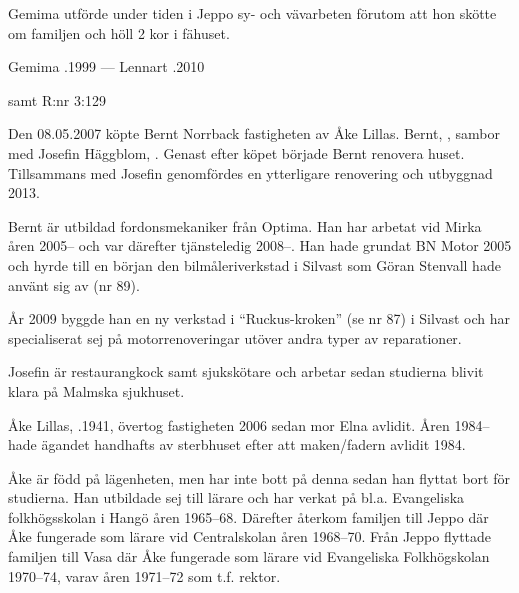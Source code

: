 Gemima utförde under tiden i Jeppo sy- och vävarbeten förutom att hon skötte om familjen och höll 2 kor i fähuset.

Gemima .1999  ---  Lennart .2010



%
 samt  R:nr 3:129



%

Den 08.05.2007 köpte Bernt Norrback fastigheten av Åke Lillas. Bernt, ,  sambor med Josefin Häggblom, . Genast efter köpet började Bernt renovera huset. Tillsammans med Josefin genomfördes en ytterligare renovering och utbyggnad 2013.

Bernt är utbildad fordonsmekaniker från Optima. Han har arbetat vid Mirka åren 2005-- och var därefter tjänsteledig 2008--. Han hade grundat BN Motor 2005 och hyrde till en början den bilmåleriverkstad i Silvast som Göran Stenvall hade använt sig av (nr 89).

År 2009 byggde han en ny verkstad i ``Ruckus-kroken'' (se nr 87) i Silvast och har specialiserat sej på motorrenoveringar utöver andra typer av reparationer.

Josefin är restaurangkock samt sjukskötare och arbetar sedan studierna blivit klara på Malmska sjukhuset.
\begin{jhchildren}
  \item {}
  \item {}
\end{jhchildren}


%
Åke Lillas, .1941, övertog fastigheten 2006 sedan mor Elna avlidit. Åren 1984-- hade ägandet handhafts av sterbhuset efter	att maken/fadern avlidit 1984.

Åke är född på lägenheten, men har inte bott på denna sedan han	flyttat bort för studierna. Han utbildade sej till lärare och har verkat	på bl.a. Evangeliska folkhögsskolan i Hangö åren 1965--68. Därefter	återkom familjen till Jeppo där Åke fungerade som lärare vid Centralskolan åren 1968--70. Från Jeppo flyttade familjen till Vasa där Åke fungerade som lärare vid Evangeliska Folkhögskolan 1970--74, varav	åren 1971--72 som t.f. rektor.

